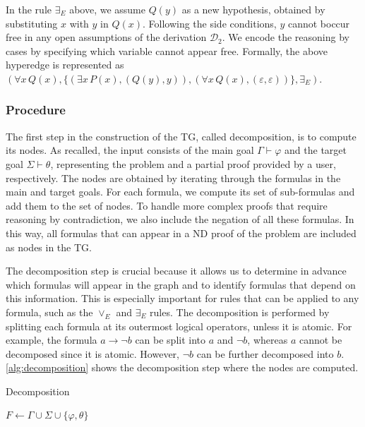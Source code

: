 In the rule $\exists_E$ above, we assume $Q(y)$ as a new hypothesis, obtained by substituting $x$ with $y$ in $Q(x)$. Following the side conditions, \(y\) cannot boccur free in any open assumptions of the derivation \(\mathcal{D}_2\). We encode the reasoning by cases by specifying which variable cannot appear free. Formally, the above hyperedge is represented as $(\forall x \, Q(x), \{(\exists x \, P(x), (Q(y), y)), (\forall x \, Q(x), (\varepsilon, \varepsilon))\}, \exists_E)$.

\subsubsection*{Procedure}
The first step in the construction of the \gls{TG}, called decomposition, is to compute its nodes. As recalled, the input consists of the main goal \(\Gamma \vdash \varphi\) and the target goal \(\Sigma \vdash \theta\), representing the problem and a partial proof provided by a user, respectively. The nodes are obtained by iterating through the formulas in the main and target goals. For each formula, we compute its set of sub-formulas and add them to the set of nodes. To handle more complex proofs that require reasoning by contradiction, we also include the negation of all these formulas. In this way, all formulas that can appear in a \gls{ND} proof of the problem are included as nodes in the \gls{TG}.

The decomposition step is crucial because it allows us to determine in advance which formulas will appear in the graph and to identify formulas that depend on this information. This is especially important for rules that can be applied to any formula, such as the \(\vee_E\) and \(\exists_E\) rules. The decomposition is performed by splitting each formula at its outermost logical operators, unless it is atomic. For example, the formula \(a \to \lnot b\) can be split into \(a\) and \(\lnot b\), whereas \(a\) cannot be decomposed since it is atomic. However, \(\lnot b\) can be further decomposed into \(b\). \autoref{alg:decomposition} shows the decomposition step where the nodes are computed.

\vspace{1em}
\begin{algorithm}[h]
\caption{Decomposition}
\label{alg:decomposition}

$F \leftarrow \Gamma \cup \Sigma \cup \{\varphi, \theta\}$


\end{algorithm}

